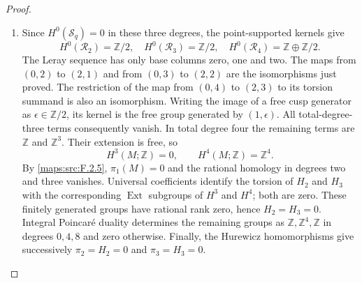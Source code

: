 \begin{proof}
\begin{enumerate}[label=\arabic*.]
\item Since $H^0(\mathcal S_q)=0$ in these three degrees, the
point-supported kernels give
\[
 H^0(\mathcal R_2)=\mathbb Z/2,\quad
 H^0(\mathcal R_3)=\mathbb Z/2,\quad
 H^0(\mathcal R_4)=\mathbb Z\oplus\mathbb Z/2.
\]
The Leray sequence
\cite[Tag 01F2, Lemma 20.13.4; chapter PDF p.~22]{StacksProject}
has only base columns zero, one and two.
The maps from $(0,2)$ to $(2,1)$ and from $(0,3)$ to $(2,2)$ are
the isomorphisms just proved.  The restriction of the map from
$(0,4)$ to $(2,3)$ to its torsion summand is also an isomorphism.
Writing the image of a free cusp generator as $\epsilon\in\mathbb Z/2$,
its kernel is the free group generated by $(1,\epsilon)$.
All total-degree-three terms consequently vanish.  In total degree
four the remaining terms are $\mathbb Z$ and $\mathbb Z^3$.
Their extension is free, so
\[
                   H^3(M;\mathbb Z)=0,\qquad
                   H^4(M;\mathbb Z)=\mathbb Z^4.
\]
By \cref{maps:src:F.2.5}, $\pi_1(M)=0$ and the rational homology
in degrees two and three vanishes.  Universal coefficients
\cite[Theorem 3.2, p.~195, and Corollary 3.3, p.~196]{Hatcher2002}
identify the torsion of $H_2$ and $H_3$ with the corresponding
$\operatorname{Ext}$ subgroups of $H^3$ and $H^4$; both are zero.
These finitely generated groups have rational rank zero, hence
$H_2=H_3=0$.  Integral Poincar\'e duality
\cite[Theorem 3.30, p.~241]{Hatcher2002} determines the remaining
groups as $\mathbb Z,\mathbb Z^4,\mathbb Z$ in degrees $0,4,8$ and
zero otherwise.  Finally, the Hurewicz homomorphisms
\cite[Theorem 4.32, p.~366]{Hatcher2002} give successively
$\pi_2=H_2=0$ and $\pi_3=H_3=0$.
\end{enumerate}
\end{proof}




